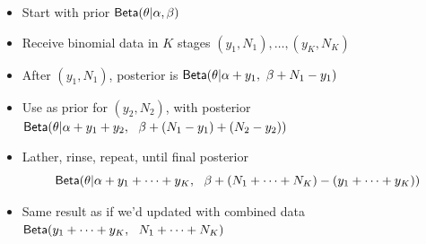 \documentclass[10pt]{report}
\begin{document}
%
\vspace*{-4pt}
\begin{itemize}
\item Start with prior $\text{\sf Beta}(\theta|\alpha,\beta)$
\item Receive binomial data in $K$ stages $(y_1, N_1), \ldots, (y_K, N_K)$
\item After $(y_1,N_1)$, posterior is
  $\text{\sf Beta}(\theta|\alpha + y_1, \ \beta + N_1 - y_1)$
\item Use as prior for $(y_2,N_2)$, with posterior \\[3pt]
  $\distro{Beta}(\theta|\alpha + y_1 + y_2, \ \ \beta + (N_1 -
  y_1) + (N_2 - y_2))$
\item Lather, rinse, repeat, until final posterior
\[
\text{\sf Beta}(\theta|\alpha + y_1 + \cdots + y_K, \ \ \beta + (N_1 +
\cdots + N_K) - (y_1 + \cdots + y_K))
\]
\item Same result as if we'd updated with combined data \\[3pt]
$\text{\sf Beta}(y_1 + \cdots + y_K, \ \ N_1 + \cdots + N_K)$
\end{itemize}


\end{document}
